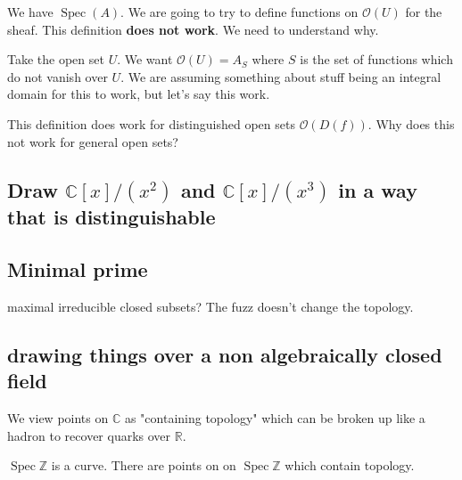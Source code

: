 \documentclass{book}
\newcommand{\Z}{\ensuremath{\mathbb{Z}}}
\newcommand{\C}{\ensuremath{\mathbb{C}}}
\newcommand{\R}{\ensuremath{\mathbb{R}}}
\renewcommand{\O}{\ensuremath{\mathcal{O}}}
\newcommand{\spec}{\operatorname{Spec}}
\theoremstyle{definition}
\begin{document}
We have $\spec(A)$. We are going to try to define functions on $\O(U)$ for the
sheaf. This definition \textbf{does not work}. We need to understand why.


Take the open set $U$. We want $\O(U) = A_{S}$ where $S$ is the set of functions
which do not vanish over $U$. We are assuming something about stuff being
an integral domain for this to work, but let's say this work.

This definition does work for distinguished open sets $\O(D(f))$. Why does this
not work for general open sets?

\subsection{Draw $\C[x]/(x^2)$ and $\C[x]/(x^3)$ in a way that is distinguishable}

\subsection{Minimal prime}
maximal irreducible closed subsets? The fuzz doesn't change the topology. 



\subsection{drawing things over a non algebraically closed field}
We view points on $\C$ as "containing topology" which can be broken
up like a hadron to recover quarks over $\R$.

$\spec \Z$ is a curve. There are points on on $\spec \Z$ which contain
topology.
\end{document}
